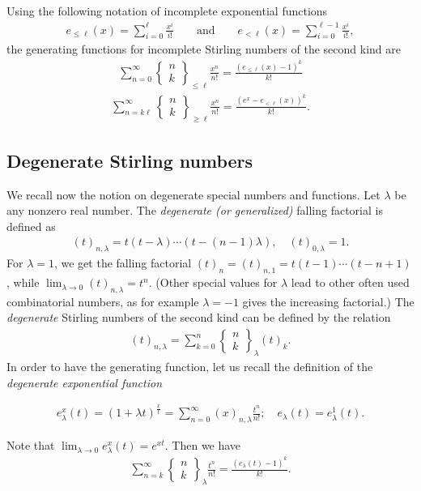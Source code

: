 \documentclass[12pt, reqno]{amsart}
\newtheorem{proof 1}{proof 1}
\def\sts#1#2{\begin{Bmatrix}
#1 \\ #2 \end{Bmatrix}}
\begin{document}
Using the following notation of incomplete exponential functions
\begin{align*}
e_{\leq\ell}(x)= \sum_{i =0}^{\ell} \frac{x^i}{i!} \qquad \mbox{and} \qquad e_{<\ell}(x) = \sum_{i=0}^{\ell-1}\frac{x^i}{i!},
\end{align*}
the generating functions for incomplete Stirling numbers of the second kind are \cite{komatsu2015incomplete}
\begin{align*}
	\sum_{n=0}^\infty  \sts{n}{k}_{\leq \ell}\frac{x^n}{n!}=\frac{(e_{\leq \ell}(x)-1)^k}{k!}
    \end{align*}
    \begin{align}\label{equation:26}
	\sum_{n=k\ell}^\infty \sts{n}{k}_{\geq \ell}\frac{x^n}{n!}=\frac{(e^x-e_{<\ell}(x))^k}{k!}.
\end{align}
\subsection{Degenerate Stirling numbers}
We recall now the notion on degenerate special numbers and functions.  Let $\lambda$ be any nonzero real number. 
The \emph{degenerate (or generalized)} falling factorial is defined as  
\begin{align*}
(t)_{n,\lambda} = t(t-\lambda)\cdots(t-(n-1)\lambda), \quad (t)_{0,\lambda} = 1.
\end{align*}
For $\lambda = 1$, we get the falling factorial $(t)_n = (t)_{n,1}= t(t-1)\cdots(t-n+1)$, while $\lim_{\lambda\to 0} (t)_{n,\lambda} = t^n$.  (Other special values for $\lambda$ lead to other often used combinatorial numbers, as for example $\lambda =-1$ gives the increasing factorial.)
The \emph{degenerate} Stirling numbers of the second kind can be defined by the relation
\begin{align*}
(t)_{n,\lambda} = \sum_{k=0}^{n} \sts{n}{k}_{\lambda} (t)_k.
\end{align*}
In order to have the generating function, let us recall the definition of the \emph{degenerate exponential function} \cite{KimKim2020}

\begin{align*}
e_{\lambda}^x(t) = (1+\lambda t)^{\frac{x}{t}} = \sum_{n=0}^{\infty} (x)_{n,\lambda} \frac{t^n}{n!}; \quad e_{\lambda}(t) = e^{1}_{\lambda}(t).
\end{align*}


Note that $\lim_{\lambda\to 0}e^{x}_{\lambda}(t) = e^{xt}$. 
Then we have 
\begin{align*}
\sum_{n=k}^{\infty} \sts{n}{k}_{\lambda}\frac{t^n}{n!} = \frac{(e_{\lambda}(t)-1)^k}{k!}.
\end{align*}
\end{document}
